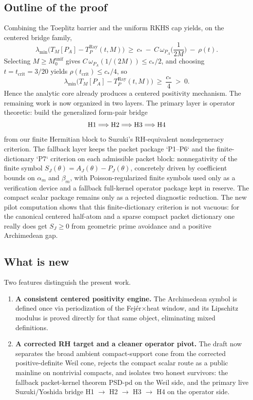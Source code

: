 \subsection*{Outline of the proof}

Combining the Toeplitz barrier and the uniform RKHS cap yields, on the centered bridge family,
\[
  \lambda_{\min}\!\big(T_M[P_A]-T_P^{\mathrm{Ray}}(t,M)\big)
  \ \ge\ c_*\ -\ C\,\omega_{P_A}\!\Big(\frac{1}{2M}\Big)\ -\ \rho(t).
\]
Selecting $M\ge M_0^{\mathrm{unif}}$ gives $C\,\omega_{P_A}(1/(2M))\le c_*/2$, and
choosing $t=t_{\mathrm{crit}}=3/20$ yields $\rho(t_{\mathrm{crit}})\le c_*/4$, so
\[
  \lambda_{\min}\!\big(T_M[P_A]-T_P^{\mathrm{Ray}}(t,M)\big)\ \ge\ \frac{c_*}{4}\ >\ 0.
\]
Hence the analytic core already produces a centered positivity mechanism. The
remaining work is now organized in two layers. The primary layer is operator
theoretic: build the generalized form-pair bridge
\[
  \textup{H1} \Longrightarrow \textup{H2} \Longrightarrow \textup{H3} \Longrightarrow \textup{H4}
\]
from our finite Hermitian block to Suzuki's RH-equivalent nondegeneracy
criterion. The fallback layer keeps the packet package `P1--P6` and the
finite-dictionary `P7` criterion on each admissible packet block:
nonnegativity of the finite symbol $S_J(\theta)=A_J(\theta)-P_J(\theta)$,
concretely driven by coefficient bounds on $\alpha_m$ and $\beta_m$, with
Poisson-regularized finite symbols used only as a verification device and a
fallback full-kernel operator package kept in reserve. The compact scalar
package remains only as a rejected diagnostic reduction.
The new pilot computation shows that this finite-dictionary criterion is not
vacuous: for the canonical centered half-atom and a sparse compact packet
dictionary one really does get $S_J\ge0$ from geometric prime avoidance and a
positive Archimedean gap.

\subsection*{What is new}

Two features distinguish the present work.
\begin{enumerate}
  \item \textbf{A consistent centered positivity engine.} The Archimedean symbol is defined once via periodization of the Fej\'er$\times$heat window, and its Lipschitz modulus is proved directly for that same object, eliminating mixed definitions.
  \item \textbf{A corrected RH target and a cleaner operator pivot.} The draft now separates the broad ambient compact-support cone from the corrected positive-definite Weil cone, rejects the compact scalar route as a public mainline on nontrivial compacts, and isolates two honest survivors: the fallback packet-kernel theorem \textup{PSD-pd} on the Weil side, and the primary live Suzuki/Yoshida bridge \textup{H1} $\to$ \textup{H2} $\to$ \textup{H3} $\to$ \textup{H4} on the operator side.
\end{enumerate}

